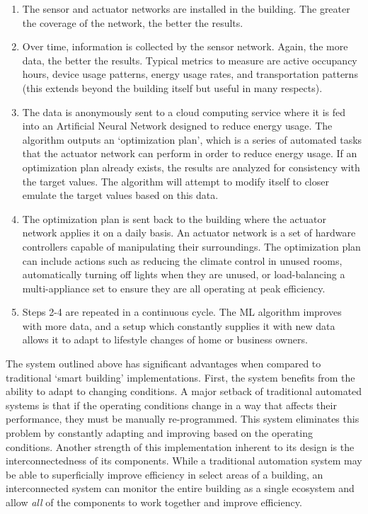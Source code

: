 \documentclass[letterpaper]{article}
\begin{document}
\begin{center}
\begin{enumerate}
\item
    The sensor and actuator networks are installed in the building. The greater the coverage of the network, the better the results.
\item
    Over time, information is collected by the sensor network. Again, the more data, the better the results. Typical metrics to measure are active occupancy hours, device usage patterns, energy usage rates, and transportation patterns (this extends beyond the building itself but useful in many respects).
\item
    The data is anonymously sent to a cloud computing service where it is fed into an Artificial Neural Network designed to reduce energy usage. The algorithm outputs an `optimization plan', which is a series of automated tasks that the actuator network can perform in order to reduce energy usage. If an optimization plan already exists, the results are analyzed for consistency with the target values. The algorithm will attempt to modify itself to closer emulate the target values based on this data.
\item
    The optimization plan is sent back to the building where the actuator network applies it on a daily basis. An actuator network is a set of hardware controllers capable of manipulating their surroundings. The optimization plan can include actions such as reducing the climate control in unused rooms, automatically turning off lights when they are unused, or load-balancing a multi-appliance set to ensure they are all operating at peak efficiency.
\item
    Steps 2-4 are repeated in a continuous cycle. The ML algorithm improves with more data, and a setup which constantly supplies it with new data allows it to adapt to lifestyle changes of home or business owners.
\end{enumerate}
\end{center}

The system outlined above has significant advantages when compared to traditional `smart building' implementations. First, the system benefits from the ability to adapt to changing conditions. A major setback of traditional automated systems is that if the operating conditions change in a way that affects their performance, they must be manually re-programmed. This system eliminates this problem by constantly adapting and improving based on the operating conditions. Another strength of this implementation inherent to its design is the interconnectedness of its components. While a traditional automation system may be able to superficially improve efficiency in select areas of a building, an interconnected system can monitor the entire building as a single ecosystem and allow \emph{all} of the components to work together and improve efficiency.\par
\end{document}
